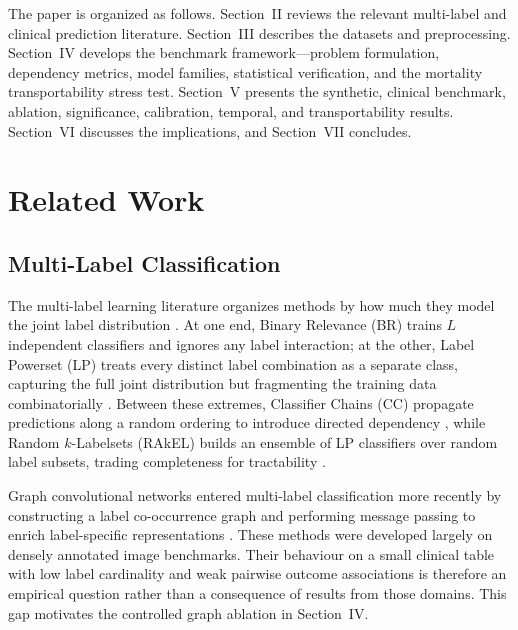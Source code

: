 \documentclass{ieeeaccess}
\begin{document}
The paper is organized as follows. Section~II reviews the relevant multi-label and clinical prediction literature. Section~III describes the datasets and preprocessing. Section~IV develops the benchmark framework---problem formulation, dependency metrics, model families, statistical verification, and the mortality transportability stress test. Section~V presents the synthetic, clinical benchmark, ablation, significance, calibration, temporal, and transportability results. Section~VI discusses the implications, and Section~VII concludes.

\section{Related Work}
\label{sec:related}

\subsection{Multi-Label Classification}

The multi-label learning literature organizes methods by how much they model the joint label distribution \cite{zhang2014,gibaja2015}. At one end, Binary Relevance (BR) trains $L$ independent classifiers and ignores any label interaction; at the other, Label Powerset (LP) treats every distinct label combination as a separate class, capturing the full joint distribution but fragmenting the training data combinatorially \cite{tsoumakas2007b}. Between these extremes, Classifier Chains (CC) propagate predictions along a random ordering to introduce directed dependency \cite{read2011}, while Random $k$-Labelsets (RAkEL) builds an ensemble of LP classifiers over random label subsets, trading completeness for tractability \cite{tsoumakas2007}.

Graph convolutional networks entered multi-label classification more recently by constructing a label co-occurrence graph and performing message passing to enrich label-specific representations \cite{chen2019mlgcn,wang2020}. These methods were developed largely on densely annotated image benchmarks. Their behaviour on a small clinical table with low label cardinality and weak pairwise outcome associations is therefore an empirical question rather than a consequence of results from those domains. This gap motivates the controlled graph ablation in Section~IV.
\end{document}
